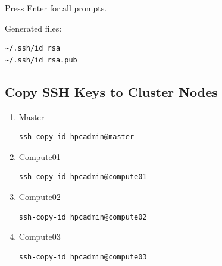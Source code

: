 \documentclass[11pt]{article}
\begin{document}
Press Enter for all prompts.

Generated files:

\begin{verbatim}
~/.ssh/id_rsa
~/.ssh/id_rsa.pub
\end{verbatim}
\subsection{Copy SSH Keys to Cluster Nodes}
\label{sec:orgbf47057}
\begin{enumerate}
\item Master
\label{sec:org2d55aea}

\begin{verbatim}
ssh-copy-id hpcadmin@master
\end{verbatim}
\item Compute01
\label{sec:orgc3428f0}

\begin{verbatim}
ssh-copy-id hpcadmin@compute01
\end{verbatim}
\item Compute02
\label{sec:org8f8ba13}

\begin{verbatim}
ssh-copy-id hpcadmin@compute02
\end{verbatim}
\item Compute03
\label{sec:orgce74d7b}

\begin{verbatim}
ssh-copy-id hpcadmin@compute03
\end{verbatim}
\end{enumerate}
\end{document}
